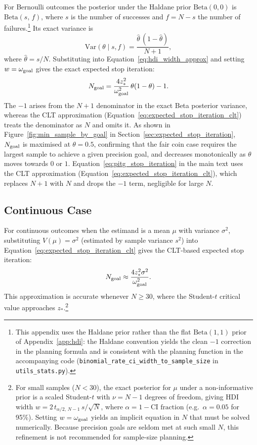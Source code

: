 For Bernoulli outcomes the posterior under the Haldane prior $\mathrm{Beta}(0,0)$
is $\mathrm{Beta}(s,\,f)$, where $s$ is the number of successes and
$f = N - s$ the number of failures.\footnote{This appendix uses the
Haldane prior rather than the flat $\mathrm{Beta}(1,1)$ prior of
Appendix~\ref{app:hdi}: the Haldane convention yields the clean $-1$ correction
in the planning formula and is consistent with the planning function in the
accompanying code (\texttt{binomial\_rate\_ci\_width\_to\_sample\_size} in
\texttt{utils\_stats.py}).}
Its exact variance is
\[
\mathrm{Var}(\theta \mid s, f) = \frac{\hat\theta\,(1-\hat\theta)}{N+1},
\]
where $\hat\theta = s/N$. Substituting into Equation~\ref{eq:hdi_width_approx}
and setting $w = \omega_{\rm goal}$ gives the exact expected stop iteration:
\begin{equation}\label{eq:expected_stop_iteration_binomial}
N_{\rm goal} = \frac{4 z_{*}^{2}}{\omega_{\rm goal}^{2}}\,\theta(1-\theta) - 1.
\end{equation}
The $-1$ arises from the $N+1$ denominator in the exact Beta posterior variance,
whereas the CLT approximation (Equation~\ref{eq:expected_stop_iteration_clt})
treats the denominator as $N$ and omits it.
As shown in Figure~\ref{fig:min_sample_by_goal} in Section~\ref{sec:expected_stop_iteration},
$N_{\rm goal}$ is maximised at $\theta=0.5$, confirming that the fair coin case requires the
largest sample to achieve a given precision goal, and decreases monotonically as
$\theta$ moves towards $0$ or $1$.
Equation~\ref{eq:pitg_stop_iteration} in the main text uses the CLT approximation
(Equation~\ref{eq:expected_stop_iteration_clt}), which replaces $N+1$ with $N$ and
drops the $-1$ term, negligible for large $N$.


\subsection*{Continuous Case}

For continuous outcomes when the estimand is a mean $\mu$ with variance
$\sigma^{2}$, substituting $V(\mu)=\sigma^{2}$ (estimated by sample variance
$s^{2}$) into Equation~\ref{eq:expected_stop_iteration_clt} gives the
CLT-based expected stop iteration:
\begin{equation}\label{eq:expected_stop_iteration_mean}
N_{\rm goal} \approx \frac{4 z_{*}^{2}\sigma^{2}}{\omega_{\rm goal}^{2}}.
\end{equation}
This approximation is accurate whenever $N \ge 30$, where the Student-$t$
critical value approaches $z_{*}$.\footnote{
  For small samples ($N < 30$), the exact posterior for $\mu$ under a
  non-informative prior is a scaled Student-$t$ with $\nu = N-1$ degrees
  of freedom, giving HDI width $w = 2\,t_{\alpha/2,\,N-1}\,s/\!\sqrt{N}$,
  where $\alpha = 1 - \text{CI fraction}$ (e.g.\ $\alpha = 0.05$ for
  95\%).  Setting $w = \omega_{\rm goal}$ yields an implicit equation in
  $N$ that must be solved numerically.  Because precision goals are seldom
  met at such small $N$, this refinement is not recommended for
  sample-size planning.}

